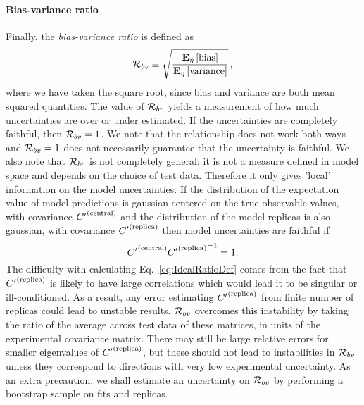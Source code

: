 
\paragraph{Bias-variance ratio}

Finally, the {\em bias-variance ratio} is defined as
\begin{equation}
    \label{eq:RatioDef}
    \mathcal{R}_{bv} \equiv \sqrt{\frac{\mathbf{E}_{\eta}\left[ {\rm bias} \right]}{\mathbf{E}_{\eta}\left[ {\rm variance} \right]}}\, ,
\end{equation}
where we have taken the square root, since bias and variance are both mean
squared quantities. The value of $\mathcal{R}_{bv}$ yields a measurement of how
much uncertainties are over or under estimated. If the uncertainties are
completely faithful, then $\mathcal{R}_{bv} = 1$. We note that the relationship
does not work both ways and $\mathcal{R}_{bv} = 1$ does not necessarily guarantee
that the uncertainty is faithful. We also note that $\mathcal{R}_{bv}$ is not
completely general: it is not a measure defined in model space and depends on
the choice of test data. Therefore it only gives 'local' information on the
model uncertainties. If the distribution of the expectation value of model
predictions is gaussian centered on the true observable values, with covariance
${{C}^{\prime}}^{(\rm central)}$ and the distribution of the model replicas is also gaussian, with
covariance ${{C}^{\prime}}^{(\rm replica)}$ then model uncertainties are faithful if
\begin{equation}\label{eq:IdealRatioDef}
    {{C}^{\prime}}^{(\rm central)} {{{C}^{\prime}}^{(\rm replica)}}^{-1} = 1.
\end{equation}
The difficulty with calculating Eq.~\ref{eq:IdealRatioDef} comes from the fact
that ${{C}^{\prime}}^{(\rm replica)}$ is likely to have large correlations which would lead it to be
singular or ill-conditioned. As a result, any error estimating ${{C}^{\prime}}^{(\rm replica)}$ from
finite number of replicas could lead to unstable results. $\mathcal{R}_{bv}$
overcomes this instability by taking the ratio of the average across test data
of these matrices, in units of the experimental covariance matrix. There may
still be large relative errors for smaller eigenvalues of ${{C}^{\prime}}^{(\rm replica)}$, but these
should not lead to instabilities in $\mathcal{R}_{bv}$ unless they correspond to
directions with very low experimental uncertainty. As an extra precaution, we
shall estimate an uncertainty on $\mathcal{R}_{bv}$ by performing a bootstrap
sample on fits and replicas.

